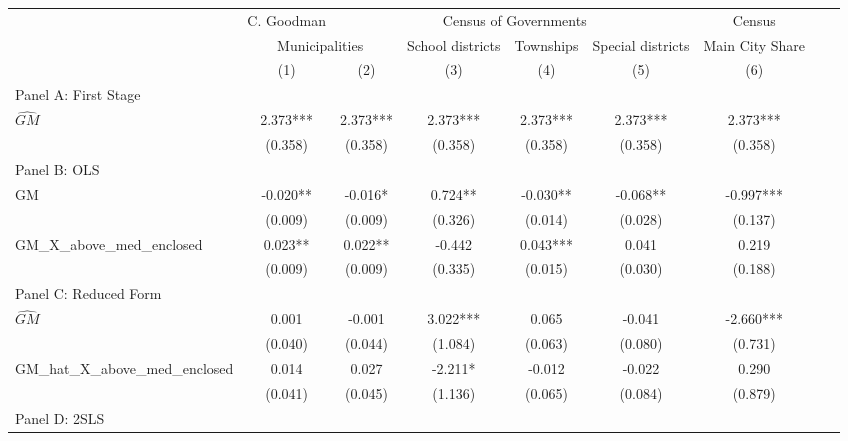  \begin{tabular}{l*{8}{c}} \toprule
&\multicolumn{1}{c}{C. Goodman}&\multicolumn{4}{c}{Census of Governments}&\multicolumn{1}{c}{Census}\\\cmidrule(lr){2-2}\cmidrule(lr){3-6}\cmidrule(lr){7-7}
&\multicolumn{2}{c}{Municipalities}&\multicolumn{1}{c}{School districts}&\multicolumn{1}{c}{Townships}&\multicolumn{1}{c}{Special districts}&\multicolumn{1}{c}{Main City Share}\\\cmidrule(lr){2-3}\cmidrule(lr){4-6}\cmidrule(lr){7-7}
&\multicolumn{1}{c}{(1)}&\multicolumn{1}{c}{(2)}&\multicolumn{1}{c}{(3)}&\multicolumn{1}{c}{(4)}&\multicolumn{1}{c}{(5)}&\multicolumn{1}{c}{(6)}\\
\cmidrule(lr){1-7}
\multicolumn{6}{l}{Panel A: First Stage}\\
\cmidrule(lr){1-7}
$\widehat{GM}$  &    2.373***&    2.373***&    2.373***&    2.373***&    2.373***&    2.373***\\
                &  (0.358)   &  (0.358)   &  (0.358)   &  (0.358)   &  (0.358)   &  (0.358)   \\
\cmidrule(lr){1-7}
\multicolumn{6}{l}{Panel B: OLS}\\
\cmidrule(lr){1-7}
GM              &   -0.020** &   -0.016*  &    0.724** &   -0.030** &   -0.068** &   -0.997***\\
                &  (0.009)   &  (0.009)   &  (0.326)   &  (0.014)   &  (0.028)   &  (0.137)   \\
\addlinespace
GM\_X\_above\_med\_enclosed&    0.023** &    0.022** &   -0.442   &    0.043***&    0.041   &    0.219   \\
                &  (0.009)   &  (0.009)   &  (0.335)   &  (0.015)   &  (0.030)   &  (0.188)   \\
\cmidrule(lr){1-7}
\multicolumn{6}{l}{Panel C: Reduced Form}\\
\cmidrule(lr){1-7}
$\widehat{GM}$  &    0.001   &   -0.001   &    3.022***&    0.065   &   -0.041   &   -2.660***\\
                &  (0.040)   &  (0.044)   &  (1.084)   &  (0.063)   &  (0.080)   &  (0.731)   \\
\addlinespace
GM\_hat\_X\_above\_med\_enclosed&    0.014   &    0.027   &   -2.211*  &   -0.012   &   -0.022   &    0.290   \\
                &  (0.041)   &  (0.045)   &  (1.136)   &  (0.065)   &  (0.084)   &  (0.879)   \\
\cmidrule(lr){1-7}
\multicolumn{6}{l}{Panel D: 2SLS}\\

\end{tabular}
